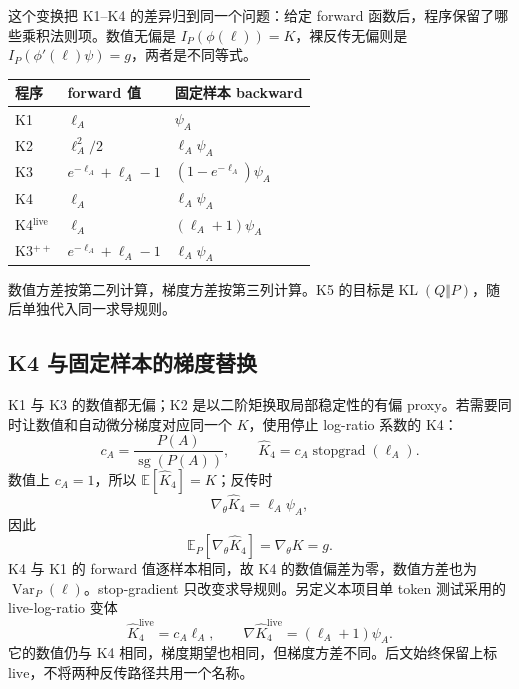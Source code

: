 \documentclass[lang=cn,scheme=chinese,openany]{../book/elegantbook}
\newcommand{\E}{\mathbb E}
\newcommand{\KL}{\operatorname{KL}}
\newcommand{\Var}{\operatorname{Var}}
\newcommand{\sg}{\operatorname{stopgrad}}
\begin{document}
这个变换把 K1--K4 的差异归到同一个问题：给定 forward 函数后，程序保留了哪些乘积法则项。数值无偏是 $I_P(\phi(\ell))=K$，裸反传无偏则是 $I_P(\phi'(\ell)\psi)=g$，两者是不同等式。

\begin{center}
\begin{tabular}{lll}
\toprule
程序 & forward 值 & 固定样本 backward\\
\midrule
K1 & $\ell_A$ & $\psi_A$\\
K2 & $\ell_A^2/2$ & $\ell_A\psi_A$\\
K3 & $e^{-\ell_A}+\ell_A-1$ & $(1-e^{-\ell_A})\psi_A$\\
K4 & $\ell_A$ & $\ell_A\psi_A$\\
K4$^{\mathrm{live}}$ & $\ell_A$ & $(\ell_A+1)\psi_A$\\
K3$^{++}$ & $e^{-\ell_A}+\ell_A-1$ & $\ell_A\psi_A$\\
\bottomrule
\end{tabular}
\end{center}
数值方差按第二列计算，梯度方差按第三列计算。K5 的目标是$\KL(Q\Vert P)$，随后单独代入同一求导规则。

\subsection{K4 与固定样本的梯度替换}
K1 与 K3 的数值都无偏；K2 是以二阶矩换取局部稳定性的有偏 proxy。若需要同时让数值和自动微分梯度对应同一个 $K$，使用停止 log-ratio 系数的 K4：
\begin{equation*}
 c_A=\frac{P(A)}{\operatorname{sg}(P(A))},\qquad
 \widehat K_4=c_A\sg(\ell_A).
\end{equation*}
数值上 $c_A=1$，所以 $\E[\widehat K_4]=K$；反传时
\begin{equation*}
 \nabla_\theta\widehat K_4=\ell_A\psi_A,
\end{equation*}
因此
\begin{equation*}
 \E_P[\nabla_\theta\widehat K_4]=\nabla_\theta K=g.
\end{equation*}
K4 与 K1 的 forward 值逐样本相同，故 K4 的数值偏差为零，数值方差也为 $\Var_P(\ell)$。stop-gradient 只改变求导规则。另定义本项目单 token 测试采用的 live-log-ratio 变体
\begin{equation*}
 \widehat K_4^{\mathrm{live}}=c_A \ell_A,\qquad
 \nabla\widehat K_4^{\mathrm{live}}=(\ell_A+1)\psi_A.
\end{equation*}
它的数值仍与 K4 相同，梯度期望也相同，但梯度方差不同。后文始终保留上标 $\mathrm{live}$，不将两种反传路径共用一个名称。
\end{document}
